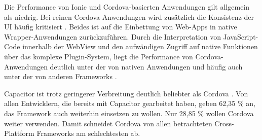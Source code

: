 Die Performance von Ionic und Cordova-basierten Anwendungen gilt allgemein als niedrig.
Bei reinen Cordova-Anwendungen wird zusätzlich die Konsistenz der \ac{UI} häufig kritisiert \cite{Steyer_Cordova}.
Beides ist auf die Einbettung von Web-Apps in native Wrapper-Anwendungen zurückzuführen.
Durch die Interpretation von JavaScript-Code innerhalb der WebView und den aufwändigen Zugriff auf native Funktionen über das komplexe Plugin-System, liegt die Performance von Cordova-Anwendungen deutlich unter der von nativen Anwendungen und häufig auch unter der von anderen Frameworks \cite{Rieger_CrossPlatform_EvaluationFramework,Biorn-Hansen_PerformanceOverhead_CrossPlatform}.


Capacitor ist trotz geringerer Verbreitung deutlich beliebter als Cordova \cite{Stackoverflow_2022,Appfigures_TopSDKs}.
Von allen Entwicklern, die bereits mit Capacitor gearbeitet haben, geben 62,35 \% an, das Framework auch weiterhin einsetzen zu wollen.
Nur 28,85 \% wollen Cordova weiter verwenden.
Damit schneidet Cordova von allen betrachteten Cross-Plattform Frameworks am schlechtesten ab.